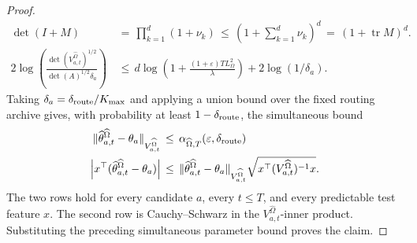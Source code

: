 \documentclass{article} %
\begin{document}
\begin{proof}
\begin{equation}
\begin{aligned}
\det(I+M)
&\,=\,
\prod_{k=1}^d(1+\nu_k)
\,\leq\,
\left(1+\sum_{k=1}^d\nu_k\right)^d
\,=\,
(1+\operatorname{tr}M)^d.
\\
2\log\!\left(
\frac{\det(V_{a,t}^{\widehat\Omega})^{1/2}}
{\det(A)^{1/2}\delta_a}
\right)
&\,\leq\,
d\log\!\left(1+\frac{(1+\varepsilon)TL_\Omega^2}{\lambda}\right)
+
2\log(1/\delta_a).
\end{aligned}
\end{equation}
Taking \(\delta_a=\delta_{\rm route}/K_{\max}\) and applying a union bound over
the fixed routing archive gives, with probability at least
\(1-\delta_{\rm route}\), the simultaneous bound
\begin{equation}
\begin{aligned}
\|\widehat\theta_{a,t}^{\widehat\Omega}-\theta_a\|_{V_{a,t}^{\widehat\Omega}}
&\,\leq\,
\alpha_{\widehat\Omega,T}(\varepsilon,\delta_{\rm route})
\\
\left|
x^\top(\widehat\theta_{a,t}^{\widehat\Omega}-\theta_a)
\right|
&\,\leq\,
\|\widehat\theta_{a,t}^{\widehat\Omega}-\theta_a\|_{V_{a,t}^{\widehat\Omega}}
\sqrt{x^\top(V_{a,t}^{\widehat\Omega})^{-1}x}.
\end{aligned}
\end{equation}
The two rows hold for every candidate \(a\), every \(t\leq T\), and every
predictable test feature \(x\). The second row is Cauchy--Schwarz in the
\(V_{a,t}^{\widehat\Omega}\)-inner product.
Substituting the preceding simultaneous parameter bound proves the claim.
\end{proof}
\end{document}
